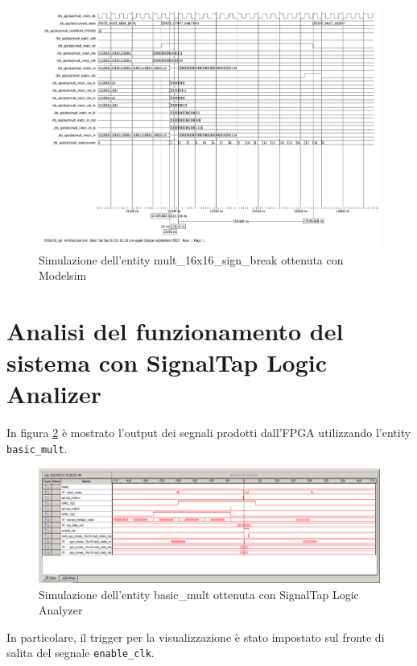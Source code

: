 \documentclass[titlepage]{report}
\begin{document}
		\begin{figure}[H]
			\centering
			\includegraphics[scale=0.5]{./img/sim_zoom_mult_inside.pdf}
			\caption{Simulazione dell'entity mult\_16x16\_sign\_break ottenuta con Modelsim}
			\label{fig:modelsim_sim_completa2}
		\end{figure}

	\section*{Analisi del funzionamento del sistema con SignalTap Logic Analizer}
	\label{sec:SignalTap}
		In figura \ref{fig:quartus_sim_signaltap} è mostrato l'output dei segnali prodotti dall'FPGA utilizzando l'entity \texttt{basic\_mult}.

		\begin{figure}[H]
			\centering
			\includegraphics[scale=0.4]{./img/signaltap_multiply_empty.png}
			\caption{Simulazione dell'entity basic\_mult ottenuta con SignalTap Logic Analyzer}
			\label{fig:quartus_sim_signaltap}
		\end{figure}

		In particolare, il trigger per la visualizzazione è stato impostato sul fronte di salita del segnale \texttt{enable\_clk}.
		
\end{document}
